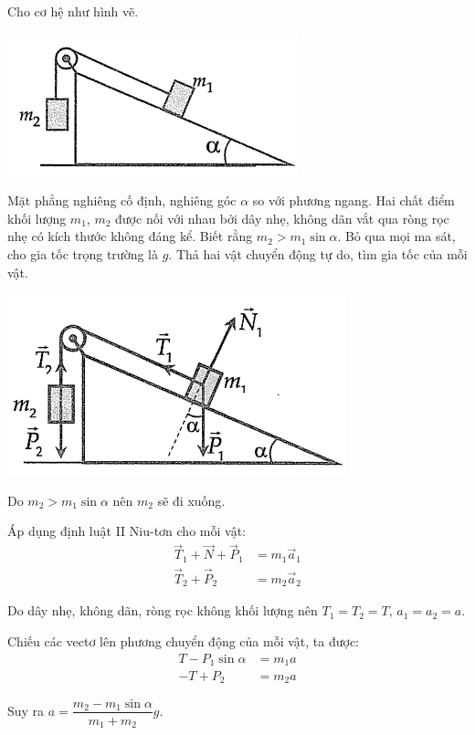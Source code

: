 \begin{enumerate}[label=\bfseries Câu \arabic*:]
\cauhoi
{Cho cơ hệ như hình vẽ.
		\begin{center}
		\includegraphics[scale=0.8]{../figs/VN10-2021-PH-TP012-3.png}
	\end{center}
	Mặt phẳng nghiêng cố định, nghiêng góc $\alpha$ so với phương ngang. Hai chất điểm khối lượng $m_1$, $m_2$ được nối với nhau bởi dây nhẹ, không dãn vắt qua ròng rọc nhẹ có kích thước không đáng kể. Biết rằng $m_2 > m_1 \sin \alpha$. Bỏ qua mọi ma sát, cho gia tốc trọng trường là $g$. Thả hai vật chuyển động tự do, tìm gia tốc của mỗi vật.
}

\loigiai
{	\begin{center}
		\includegraphics[scale=0.8]{../figs/VN10-2021-PH-TP012-4.png}
	\end{center}
	
	Do $m_2 > m_1 \sin \alpha$ nên $m_2$ sẽ đi xuống.
	
	Áp dụng định luật II Niu-tơn cho mỗi vật:
	\begin{align*}
		\vec T_1 + \vec N + \vec P_1 &= m_1 \vec a_1 \\
		\vec T_2 + \vec P_2 &= m_2 \vec a_2
	\end{align*}
	
	Do dây nhẹ, không dãn, ròng rọc không khối lượng nên $T_1 = T_2 = T$, $a_1 = a_2 = a$.
	
	Chiếu các vectơ lên phương chuyển động của mỗi vật, ta được:
	\begin{align*}
		T - P_1 \sin \alpha &= m_1 a \\
		-T + P_2 &= m_2 a
	\end{align*}
	
	Suy ra $a=\dfrac{m_2 - m_1 \sin \alpha}{m_1 + m_2}g$.
}
\end{enumerate}